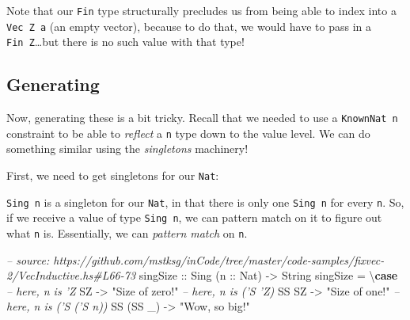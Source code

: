 \documentclass[]{article}
\newenvironment{Shaded}{}{}
\newcommand{\KeywordTok}[1]{\textcolor[rgb]{0.00,0.44,0.13}{\textbf{#1}}}
\newcommand{\DataTypeTok}[1]{\textcolor[rgb]{0.56,0.13,0.00}{#1}}
\newcommand{\CharTok}[1]{\textcolor[rgb]{0.25,0.44,0.63}{#1}}
\newcommand{\StringTok}[1]{\textcolor[rgb]{0.25,0.44,0.63}{#1}}
\newcommand{\CommentTok}[1]{\textcolor[rgb]{0.38,0.63,0.69}{\textit{#1}}}
\newcommand{\OtherTok}[1]{\textcolor[rgb]{0.00,0.44,0.13}{#1}}
\newcommand{\FunctionTok}[1]{\textcolor[rgb]{0.02,0.16,0.49}{#1}}
\newcommand{\NormalTok}[1]{#1}
\begin{document}
Note that our \texttt{Fin} type structurally precludes us from being able to
index into a \texttt{Vec\ \textquotesingle{}Z\ a} (an empty vector), because to
do that, we would have to pass in a \texttt{Fin\ \textquotesingle{}Z}\ldots{}but
there is no such value with that type!

\subsection{Generating}\label{generating-1}

Now, generating these is a bit tricky. Recall that we needed to use a
\texttt{KnownNat\ n} constraint to be able to \emph{reflect} a \texttt{n} type
down to the value level. We can do something similar using the \emph{singletons}
machinery!

First, we need to get singletons for our \texttt{Nat}:

\begin{Shaded}
\end{Shaded}

\texttt{Sing\ n} is a singleton for our \texttt{Nat}, in that there is only one
\texttt{Sing\ n} for every \texttt{n}. So, if we receive a value of type
\texttt{Sing\ n}, we can pattern match on it to figure out what \texttt{n} is.
Essentially, we can \emph{pattern match} on \texttt{n}.

\begin{Shaded}
\begin{Highlighting}[]
\CommentTok{-- source: https://github.com/mstksg/inCode/tree/master/code-samples/fixvec-2/VecInductive.hs#L66-73}
\OtherTok{singSize ::} \DataTypeTok{Sing}\NormalTok{ (}\OtherTok{n ::} \DataTypeTok{Nat}\NormalTok{) }\OtherTok{->} \DataTypeTok{String}
\NormalTok{singSize }\FunctionTok{=}\NormalTok{ \textbackslash{}}\KeywordTok{case}
    \CommentTok{-- here, n is 'Z}
    \DataTypeTok{SZ}        \OtherTok{->} \StringTok{"Size of zero!"}
    \CommentTok{-- here, n is ('S 'Z)}
    \DataTypeTok{SS} \DataTypeTok{SZ}     \OtherTok{->} \StringTok{"Size of one!"}
    \CommentTok{-- here, n is ('S ('S n))}
    \DataTypeTok{SS}\NormalTok{ (}\DataTypeTok{SS}\NormalTok{ _) }\OtherTok{->} \StringTok{"Wow, so big!"}
\end{Highlighting}
\end{Shaded}
\end{document}
